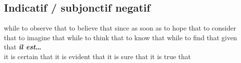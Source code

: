 
\subsection*{Indicatif /{\color{myblue} subjonctif negatif}}
   {while}
   {to observe that}
   {to believe that}
   {since}
   {as soon as}
   {to hope that}
   {to consider that}
   {to imagine that}
   {while}
   {to think that}
   {to know that}
   {while}
   {to find that}
   {given that}
     {\bf {\em il est}\ldots}\\
        {it is certain that}
        {it is evident that}
        {it is sure that}
        {it is true that}



